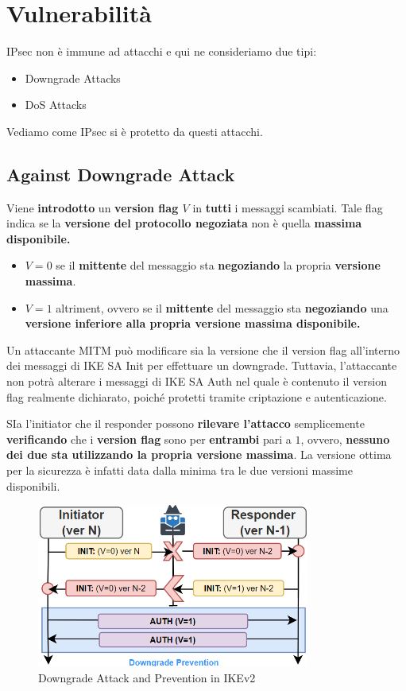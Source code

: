 \section{Vulnerabilità}
IPsec non è immune ad attacchi e qui ne consideriamo due tipi:
\begin{itemize}
    \item Downgrade Attacks
    \item DoS Attacks
\end{itemize}
Vediamo come IPsec si è protetto da questi attacchi.
\subsection{Against Downgrade Attack}
Viene \textbf{introdotto} un \textbf{version flag $V$} in \textbf{tutti} i messaggi scambiati. Tale flag indica se la \textbf{versione del protocollo negoziata} non è quella \textbf{massima disponibile.}
\begin{definition}\label{def:versionflag}
\begin{itemize}
    \item \textbf{$V=0$} se il \textbf{mittente} del messaggio sta \textbf{negoziando} la propria \textbf{versione massima}.
    \item \textbf{$V=1$} altriment, ovvero se il \textbf{mittente} del messaggio sta \textbf{negoziando} una \textbf{versione inferiore alla propria versione massima disponibile.}
\end{itemize}
\end{definition}
Un attaccante MITM può modificare sia la versione che il version flag all'interno dei messaggi di IKE SA Init per effettuare un downgrade. Tuttavia, l'attaccante non potrà alterare i messaggi di IKE SA Auth nel quale è contenuto il version flag realmente dichiarato, poiché protetti tramite criptazione e autenticazione.\\
\begin{remark}
SIa l'initiator che il responder possono \textbf{rilevare l'attacco} semplicemente \textbf{verificando} che i \textbf{version flag} sono per \textbf{entrambi} pari a $1$, ovvero, \textbf{nessuno dei due sta utilizzando la propria versione massima}. La versione ottima per la sicurezza è infatti data dalla minima tra le due versioni massime disponibili.
\end{remark}
\begin{figure}[h]
    \centering
    \includegraphics[width=0.8\textwidth]{image/ikedown.png}
    \caption{Downgrade Attack and Prevention in IKEv2}
    \label{fig:ikedown}
\end{figure}\pagebreak
